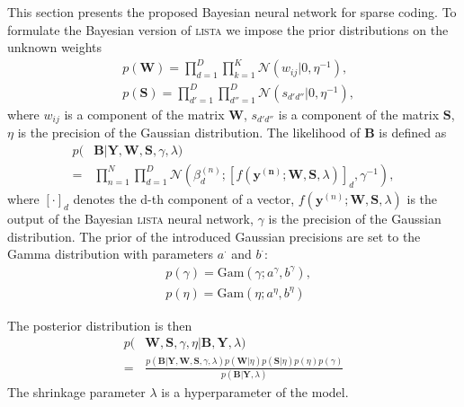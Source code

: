 \documentclass[letterpaper]{article}
\begin{document}
This section presents the proposed Bayesian neural network for sparse coding. To formulate the Bayesian version of \textsc{lista} we impose the prior distributions on the unknown weights
\begin{subequations}
\label{eq:ws}
\begin{align}
&p(\mathbf{W}) = \prod_{d=1}^D\prod_{k=1}^K \mathcal{N}(w_{ij} | 0, \eta^{-1}), \\
&p(\mathbf{S}) = \prod_{d'=1}^D\prod_{d''=1}^D \mathcal{N}(s_{d'd''} | 0, \eta^{-1}),
\end{align}
\end{subequations}
where $w_{ij}$ is a component of the matrix $\mathbf{W}$, $s_{d'd''}$ is a component of the matrix $\mathbf{S}$, $\eta$ is the precision of the Gaussian distribution.
The likelihood of $\mathbf{B}$ is defined as 
\begin{align}
p(&\mathbf{B}| \mathbf{Y}, \mathbf{W}, \mathbf{S}, \gamma, \lambda) \nonumber \\
\label{eq:likelihood}
= &\prod_{n=1}^N\prod_{d=1}^D\mathcal{N}(\beta_d^{(n)}; [f(\mathbf{y^{(n)}}; \mathbf{W}, \mathbf{S}, \lambda)]_d, \gamma^{-1}),
\end{align}
where $[\cdot]_d$ denotes the d-th component of a vector, $f(\mathbf{y}^{(n)}; \mathbf{W}, \mathbf{S}, \lambda)$ is the output of the Bayesian \textsc{lista} neural network, $\gamma$ is the precision of the Gaussian distribution.
The prior of the introduced Gaussian precisions are set to the Gamma distribution with parameters $a^{\cdot}$ and $b^{\cdot}$:
\begin{subequations}
\label{eq:gamma_eta}
\begin{align}
&p(\gamma) = \text{Gam}\left(\gamma; a^{\gamma}, b^{\gamma}\right), \\
&p(\eta) = \text{Gam}\left(\eta; 	a^{\eta}, b^{\eta}\right)
\end{align}
\end{subequations}

The posterior distribution is then
\begin{align}
p(&\mathbf{W}, \mathbf{S}, \gamma, \eta | \mathbf{B}, \mathbf{Y}, \lambda) \nonumber \\
\label{eq:posterior}
= & \frac{p(\mathbf{B} | \mathbf{Y}, \mathbf{W},  \mathbf{S}, \gamma, \lambda) p(\mathbf{W} | \eta )p(\mathbf{S} | \eta) p(\eta) p(\gamma)}{p(\mathbf{B} | \mathbf{Y}, \lambda)}
\end{align}
The shrinkage parameter $\lambda$ is a hyperparameter of the model.
\end{document}
